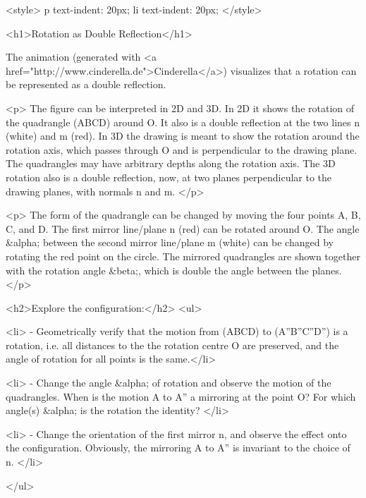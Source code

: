 <style>
p {
  text-indent: 20px;
}
li {
  text-indent: 20px;
}
</style>

<h1>Rotation as Double Reflection</h1> 


The animation (generated with <a
    href="http://www.cinderella.de">Cinderella</a>) visualizes that a rotation can be represented as a double reflection.
    
<p>  The figure can be interpreted in 2D and 3D. In 2D it shows the rotation of the quadrangle (ABCD) around O. It also is a double reflection at the two lines n (white) and m (red).  In 3D the drawing is meant to show the rotation around the rotation axis, which passes through O and is perpendicular to the drawing plane. The quadrangles may have arbitrary depths along the rotation axis. The 3D rotation also is a double reflection, now, at two planes perpendicular to the drawing planes, with normals n and m. </p>
    

<p>    The form of the quadrangle can be changed by moving the four points A, B, C, and D. The first mirror line/plane n (red) can be rotated around O. The angle &alpha; between the second mirror line/plane m (white) can be changed by rotating the red point on the circle. The mirrored quadrangles are shown together with the rotation angle &beta;, which is double the angle between the planes.</p>    
    

    
  

    <h2>Explore the configuration:</h2>
    <ul>

      <li> - Geometrically verify that the motion from (ABCD) to (A''B''C''D'') is a rotation, i.e. all distances to the the rotation centre O are preserved, and the angle of rotation for all points is the same.</li>
 			
 			<li> - Change the angle &alpha; of rotation and observe the motion of the quadrangles. When is the motion A to A'' a mirroring at the point O? For which angle(s) &alpha; is the rotation the identity?  </li>
 			
 			<li> - Change the orientation of the first mirror n, and observe the effect onto the configuration. Obviously, the mirroring A to A'' is invariant to the choice of n. </li>
 			
	    
	   
    </ul>